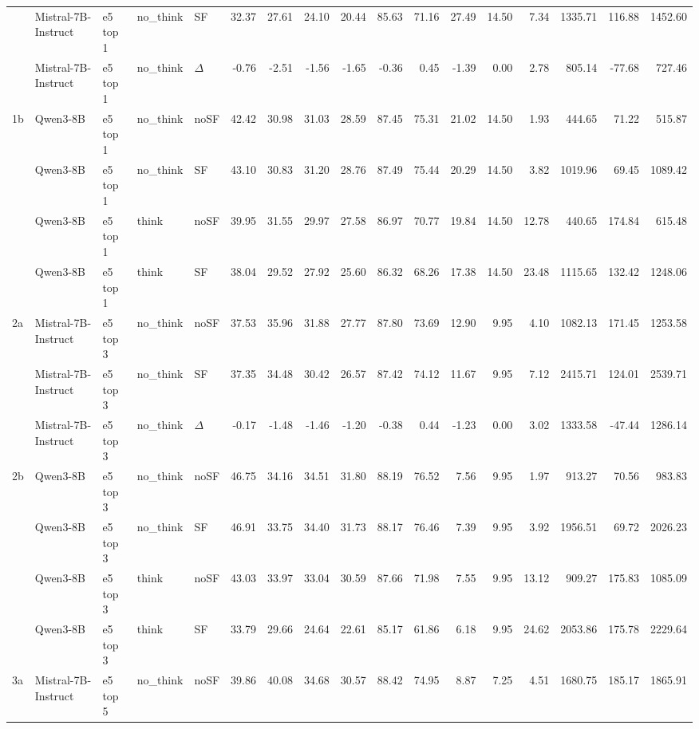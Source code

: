 \begin{landscape}
\begin{footnotesize}
\begin{longtable}{l l l l l r r r r r r r r r r r r}
 & Mistral-7B-Instruct & e5 top 1 & no\_think & SF & 32.37 & 27.61 & 24.10 & 20.44 & 85.63 & 71.16 & 27.49 & 14.50 & 7.34 & 1335.71 & 116.88 & 1452.60 \\
 & Mistral-7B-Instruct & e5 top 1 & no\_think & $\Delta$ & -0.76 & -2.51 & -1.56 & -1.65 & -0.36 & 0.45 & -1.39 & 0.00 & 2.78 & 805.14 & -77.68 & 727.46 \\
1b & Qwen3-8B & e5 top 1 & no\_think & noSF & 42.42 & 30.98 & 31.03 & 28.59 & 87.45 & 75.31 & 21.02 & 14.50 & 1.93 & 444.65 & 71.22 & 515.87 \\
 & Qwen3-8B & e5 top 1 & no\_think & SF & 43.10 & 30.83 & 31.20 & 28.76 & 87.49 & 75.44 & 20.29 & 14.50 & 3.82 & 1019.96 & 69.45 & 1089.42 \\
 & Qwen3-8B & e5 top 1 & think & noSF & 39.95 & 31.55 & 29.97 & 27.58 & 86.97 & 70.77 & 19.84 & 14.50 & 12.78 & 440.65 & 174.84 & 615.48 \\
 & Qwen3-8B & e5 top 1 & think & SF & 38.04 & 29.52 & 27.92 & 25.60 & 86.32 & 68.26 & 17.38 & 14.50 & 23.48 & 1115.65 & 132.42 & 1248.06 \\
\midrule
2a & Mistral-7B-Instruct & e5 top 3 & no\_think & noSF & 37.53 & 35.96 & 31.88 & 27.77 & 87.80 & 73.69 & 12.90 & 9.95 & 4.10 & 1082.13 & 171.45 & 1253.58 \\
 & Mistral-7B-Instruct & e5 top 3 & no\_think & SF & 37.35 & 34.48 & 30.42 & 26.57 & 87.42 & 74.12 & 11.67 & 9.95 & 7.12 & 2415.71 & 124.01 & 2539.71 \\
 & Mistral-7B-Instruct & e5 top 3 & no\_think & $\Delta$ & -0.17 & -1.48 & -1.46 & -1.20 & -0.38 & 0.44 & -1.23 & 0.00 & 3.02 & 1333.58 & -47.44 & 1286.14 \\
2b & Qwen3-8B & e5 top 3 & no\_think & noSF & 46.75 & 34.16 & 34.51 & 31.80 & 88.19 & 76.52 & 7.56 & 9.95 & 1.97 & 913.27 & 70.56 & 983.83 \\
 & Qwen3-8B & e5 top 3 & no\_think & SF & 46.91 & 33.75 & 34.40 & 31.73 & 88.17 & 76.46 & 7.39 & 9.95 & 3.92 & 1956.51 & 69.72 & 2026.23 \\
 & Qwen3-8B & e5 top 3 & think & noSF & 43.03 & 33.97 & 33.04 & 30.59 & 87.66 & 71.98 & 7.55 & 9.95 & 13.12 & 909.27 & 175.83 & 1085.09 \\
 & Qwen3-8B & e5 top 3 & think & SF & 33.79 & 29.66 & 24.64 & 22.61 & 85.17 & 61.86 & 6.18 & 9.95 & 24.62 & 2053.86 & 175.78 & 2229.64 \\
\midrule
3a & Mistral-7B-Instruct & e5 top 5 & no\_think & noSF & 39.86 & 40.08 & 34.68 & 30.57 & 88.42 & 74.95 & 8.87 & 7.25 & 4.51 & 1680.75 & 185.17 & 1865.91 \\

\end{longtable}
\end{footnotesize}
\end{landscape}
